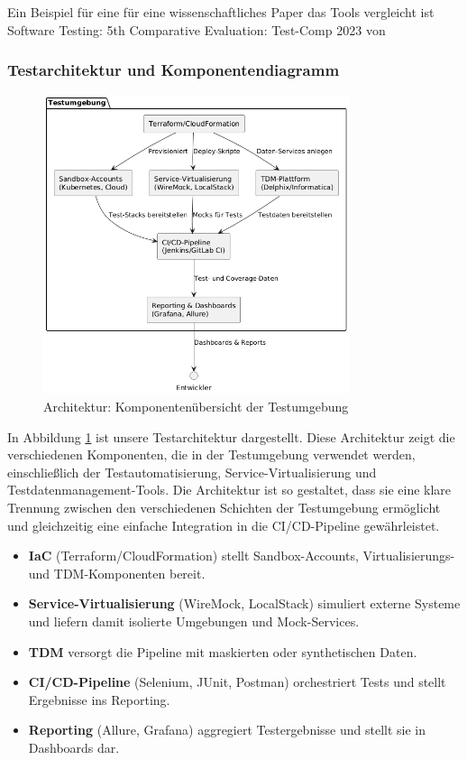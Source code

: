Ein Beispiel für eine für eine wissenschaftliches Paper das Tools vergleicht ist Software Testing:
5th Comparative Evaluation: {Test-Comp 2023} von \cite{beyer2023}

\newpage

\subsubsection{Testarchitektur und Komponentendiagramm}

\begin{figure}[h!]
    \centering
    \includegraphics[width=0.8\textwidth]{fig/test_architecture_enviroment.png}
    \caption{Architektur: Komponentenübersicht der Testumgebung}
    \label{fig:architecture}
\end{figure} 

In Abbildung \ref{fig:architecture} ist unsere Testarchitektur dargestellt.
Diese Architektur zeigt die verschiedenen Komponenten, die in der Testumgebung verwendet werden,
einschließlich der Testautomatisierung, Service-Virtualisierung und Testdatenmanagement-Tools.
Die Architektur ist so gestaltet, dass sie eine klare Trennung zwischen den verschiedenen Schichten
der Testumgebung ermöglicht und gleichzeitig eine einfache Integration in die CI/CD-Pipeline
gewährleistet.

\begin{itemize}
    \item \textbf{IaC}  (Terraform/CloudFormation) stellt Sandbox-Accounts, Virtualisierungs-
    und TDM-Komponenten bereit.
    \item \textbf{Service-Virtualisierung} (WireMock, LocalStack) simuliert externe Systeme und
    liefern damit isolierte Umgebungen und Mock-Services.
    \item \textbf{TDM} versorgt die Pipeline mit maskierten oder synthetischen Daten.
    \item \textbf{CI/CD-Pipeline} (Selenium, JUnit, Postman) orchestriert Tests und stellt
    Ergebnisse ins Reporting.
    \item \textbf{Reporting} (Allure, Grafana) aggregiert Testergebnisse und stellt sie in
    Dashboards dar.
\end{itemize}

